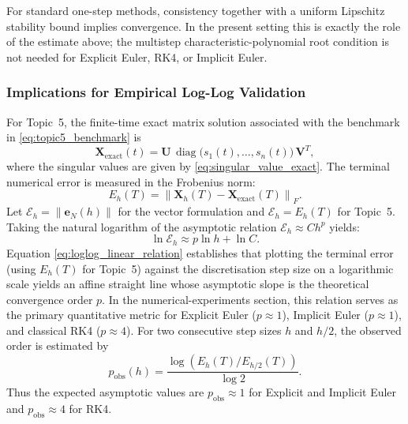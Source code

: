 For standard one-step methods, consistency together with a uniform Lipschitz stability bound implies convergence. In the present setting this is exactly the role of the estimate above; the multistep characteristic-polynomial root condition is not needed for Explicit Euler, RK4, or Implicit Euler.

\subsubsection{Implications for Empirical Log-Log Validation}
For Topic~5, the finite-time exact matrix solution associated with the
benchmark in \eqref{eq:topic5_benchmark} is
\begin{equation}
\label{eq:topic5_exact_matrix_solution}
\mathbf{X}_{\mathrm{exact}}(t)
=
\mathbf{U}\,\operatorname{diag}\bigl(s_1(t),\ldots,s_n(t)\bigr)\,\mathbf{V}^T,
\end{equation}
where the singular values are given by \eqref{eq:singular_value_exact}.
The terminal numerical error is measured in the Frobenius norm:
\begin{equation}
\label{eq:topic5_frobenius_error}
E_h(T)=\left\|\mathbf{X}_h(T)-\mathbf{X}_{\mathrm{exact}}(T)\right\|_F.
\end{equation}
Let $\mathcal{E}_h=\|\mathbf{e}_N(h)\|$ for the vector formulation
and $\mathcal{E}_h=E_h(T)$ for Topic~5. Taking the natural logarithm of
the asymptotic relation $\mathcal{E}_h\approx C h^p$ yields:
\begin{equation}
\label{eq:loglog_linear_relation}
\ln \mathcal{E}_h \approx p \ln h + \ln C.
\end{equation}
Equation \eqref{eq:loglog_linear_relation} establishes that plotting the
terminal error (using $E_h(T)$ for Topic~5) against the discretisation
step size on a logarithmic scale yields an affine straight line whose
asymptotic slope is the theoretical convergence order $p$. In the
numerical-experiments section, this relation serves as the primary
quantitative metric for Explicit Euler ($p\approx1$), Implicit Euler
($p\approx1$), and classical RK4 ($p\approx4$).
For two consecutive step sizes $h$ and $h/2$, the observed order is
estimated by
\begin{equation}
\label{eq:observed_order}
p_{\mathrm{obs}}(h)
=
\frac{\log\left(E_h(T)/E_{h/2}(T)\right)}{\log 2}.
\end{equation}
Thus the expected asymptotic values are $p_{\mathrm{obs}}\approx1$ for
Explicit and Implicit Euler and $p_{\mathrm{obs}}\approx4$ for RK4.

\newpage
